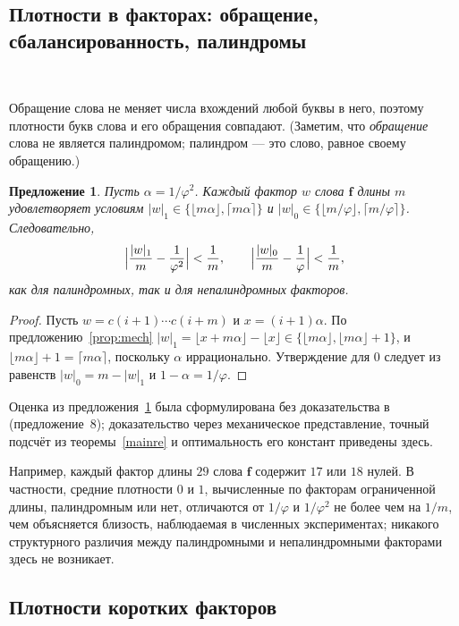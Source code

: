 \documentclass[a4paper,14pt]{extreport}
\theoremstyle{plain}
\newtheorem{proposition}[theorem]{Предложение}
\theoremstyle{definition}
\theoremstyle{remark}
\begin{document}
\subsection{Плотности в факторах: обращение, сбалансированность, палиндромы}~\label{sec3.4.2}

Обращение слова не меняет числа вхождений любой буквы в него, поэтому плотности букв слова и его обращения совпадают. (Заметим, что \emph{обращение} слова не является палиндромом; палиндром --- это слово, равное своему обращению.)

\begin{proposition}\label{prop:balance}
	Пусть $\alpha=1/\varphi^{2}$. Каждый фактор $w$ слова $\mathbf f$ длины $m$ удовлетворяет условиям
	$|w|_1\in\{\lfloor m\alpha\rfloor,\lceil m\alpha\rceil\}$ и
	$|w|_0\in\{\lfloor m/\varphi\rfloor,\lceil m/\varphi\rceil\}$. Следовательно,
	\begin{equation}
		\Bigl|\frac{|w|_1}{m}-\frac1{\varphi^{2}}\Bigr|<\frac1m,\qquad
		\Bigl|\frac{|w|_0}{m}-\frac1{\varphi}\Bigr|<\frac1m ,
	\end{equation}
	как для палиндромных, так и для непалиндромных факторов.
\end{proposition}

\begin{proof}
	Пусть $w=c(i+1)\cdots c(i+m)$ и $x=(i+1)\alpha$. По предложению~\ref{prop:mech}
	$|w|_1=\lfloor x+m\alpha\rfloor-\lfloor x\rfloor\in\{\lfloor m\alpha\rfloor,\lfloor m\alpha\rfloor+1\}$,
	и $\lfloor m\alpha\rfloor+1=\lceil m\alpha\rceil$, поскольку $\alpha$ иррационально.
	Утверждение для $0$ следует из равенств $|w|_0=m-|w|_1$ и $1-\alpha=1/\varphi$.
\end{proof}

\noindent Оценка из предложения~\ref{prop:balance} была сформулирована без доказательства в~\cite{HamoudAbdullahTver} (предложение~8); доказательство через механическое представление, точный подсчёт из теоремы~\ref{mainre} и оптимальность его констант приведены здесь.

Например, каждый фактор длины $29$ слова $\mathbf f$ содержит $17$ или $18$ нулей. В частности, средние плотности $0$ и $1$, вычисленные
по факторам ограниченной длины, палиндромным или нет, отличаются от $1/\varphi$ и $1/\varphi^{2}$
не более чем на $1/m$, чем объясняется близость, наблюдаемая в численных экспериментах; никакого структурного
различия между палиндромными и непалиндромными факторами здесь не возникает.
\subsection{Плотности коротких факторов}~\label{sec3.4.3}
\end{document}
